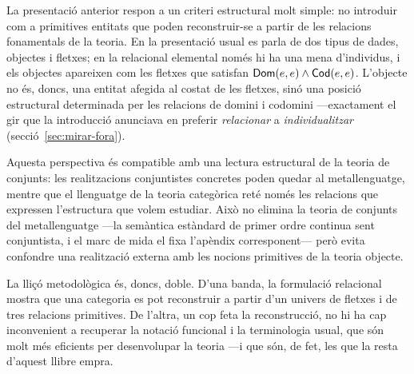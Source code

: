 La presentació anterior respon a un criteri estructural molt simple: no introduir com a primitives entitats que poden reconstruir-se a partir de les relacions fonamentals de la teoria. En la presentació usual es parla de dos tipus de dades, objectes i fletxes; en la relacional elemental només hi ha una mena d'individus, i els objectes apareixen com les fletxes que satisfan $\mathsf{Dom}(e,e)\land\mathsf{Cod}(e,e)$. L'objecte no és, doncs, una entitat afegida al costat de les fletxes, sinó una posició estructural determinada per les relacions de domini i codomini ---exactament el gir que la introducció anunciava en preferir \emph{relacionar} a \emph{individualitzar} (secció~\ref{sec:mirar-fora}).

Aquesta perspectiva és compatible amb una lectura estructural de la teoria de conjunts: les realitzacions conjuntistes concretes poden quedar al metallenguatge, mentre que el llenguatge de la teoria categòrica reté només les relacions que expressen l'estructura que volem estudiar. Això no elimina la teoria de conjunts del metallenguatge ---la semàntica estàndard de primer ordre continua sent conjuntista, i el marc de mida el fixa l'apèndix corresponent--- però evita confondre una realització externa amb les nocions primitives de la teoria objecte.

La lliçó metodològica és, doncs, doble. D'una banda, la formulació relacional mostra que una categoria es pot reconstruir a partir d'un univers de fletxes i de tres relacions primitives. De l'altra, un cop feta la reconstrucció, no hi ha cap inconvenient a recuperar la notació funcional i la terminologia usual, que són molt més eficients per desenvolupar la teoria ---i que són, de fet, les que la resta d'aquest llibre empra.
